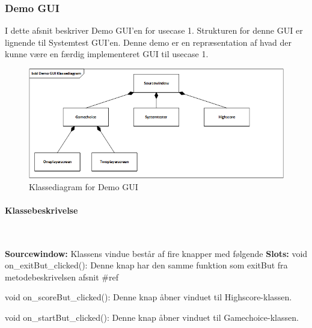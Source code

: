 \subsubsection{Demo GUI}
I dette afsnit beskriver Demo GUI'en for usecase 1.
Strukturen for denne GUI er lignende til Systemtest GUI'en.
Denne demo er en repræsentation af hvad der kunne være en færdig implementeret GUI til usecase 1.

\begin{figure}[H]
	\centering
	\includegraphics[width=1.2\textwidth]{Afsnit/DesignOgImplementering/images/DemoGUIClass}
	\caption{Klassediagram for Demo GUI}
	\label{fig:DemoGUIClass}
\end{figure}

\paragraph{Klassebeskrivelse} \mbox{} \\

\label{afsnit:democlass}

\noindent\textbf{Sourcewindow:}\newline
Klassens vindue består af fire knapper med følgende\newline
\noindent \textbf{Slots:}\newline
void on\_exitBut\_clicked():\newline
Denne knap har den samme funktion som exitBut fra metodebeskrivelsen afsnit \#ref \newline

\noindent void on\_scoreBut\_clicked():\newline
Denne knap åbner vinduet til Highscore-klassen.\newline

\noindent void on\_startBut\_clicked():\newline
Denne knap åbner vinduet til Gamechoice-klassen.\newline

